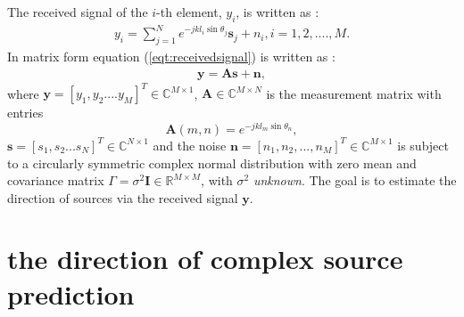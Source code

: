 \documentclass[journal]{IEEEtran}
\begin{document}
The received signal of the $i$-th element, $y_{i}$, is written as :
\begin{align} \label{eqt:receivedsignal}
 y_{i} =  \sum_{j=1}^{N}e^{-j k l_{i} \sin\theta_{j} }\mathbf{s}_{j} + n_{i}, i = 1,2,....,M.
\end{align}
In matrix form equation (\ref{eqt:receivedsignal}) is written as :
\begin{align} \label{eqt:receivedsignalmat}
\mathbf{y} = \mathbf{A}\mathbf{s} + \mathbf{n},
\end{align}
where $\mathbf{y}= [y_{1}, y_{2} ....y_{M}]^{T} \in \mathbb{C}^{M\times 1}$, $\mathbf{A} \in \mathbb{C}^{M\times N}$ is the measurement matrix with entries
\begin{equation} \label{eqt:amatrix}
\mathbf{A}(m,n) = e^{-j k l_{m} \sin\theta_{n}},
\end{equation}
$\boldsymbol{s} = [s_{1},s_{2}...s_{N}]^{T} \in \mathbb{C}^{N\times 1}$ and the noise $\mathbf{n} = [n_{1},n_{2},...,n_{M}]^{T}\in \mathbb{C}^{M\times 1} $ is subject to a circularly symmetric complex normal distribution with zero mean and covariance matrix $\Gamma = \sigma ^{2} \textbf{I} \in \mathbb{R}^{M\times M}$, with $\sigma ^{2}$ \textit{unknown}. 
The goal is to estimate the direction of sources via the received signal $\mathbf{y}$.  

\section{the direction of complex source prediction} \label{method}
\end{document}
